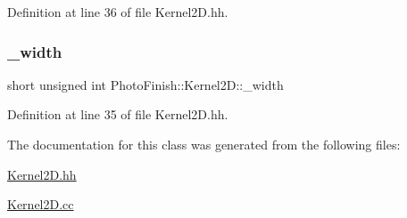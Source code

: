 Definition at line 36 of file Kernel2\+D.\+hh.

\mbox{\label{class_photo_finish_1_1_kernel2_d_a1e47b71f4a0f09cc0cd9378d43aaba06}} 
\subsubsection{\texorpdfstring{\+\_\+width}{\_width}}
{\footnotesize\ttfamily short unsigned int Photo\+Finish\+::\+Kernel2\+D\+::\+\_\+width\hspace{0.3cm}{\ttfamily [protected]}}



Definition at line 35 of file Kernel2\+D.\+hh.



The documentation for this class was generated from the following files\+:\begin{DoxyCompactItemize}
\item 
\hyperlink{_kernel2_d_8hh}{Kernel2\+D.\+hh}\item 
\hyperlink{_kernel2_d_8cc}{Kernel2\+D.\+cc}\end{DoxyCompactItemize}
